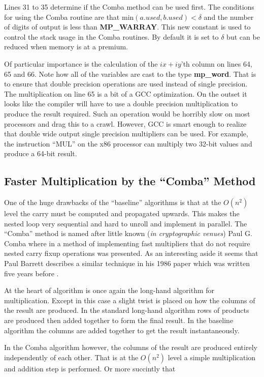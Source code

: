 \documentclass[b5paper]{book}
\begin{document}
Lines 31 to 35 determine if the Comba method can be used first.  The conditions for using the Comba routine are that min$(a.used, b.used) < \delta$ and
the number of digits of output is less than \textbf{MP\_WARRAY}.  This new constant is used to control the stack usage in the Comba routines.  By
default it is set to $\delta$ but can be reduced when memory is at a premium.

Of particular importance is the calculation of the $ix+iy$'th column on lines 64, 65 and 66.  Note how all of the
variables are cast to the type \textbf{mp\_word}.  That is to ensure that double precision operations are used instead of single precision.  The
multiplication on line 65 is a bit of a GCC optimization.  On the outset it looks like the compiler will have to use a double precision
multiplication to produce the result required.  Such an operation would be horribly slow on most processors and drag this to a crawl.  However,
GCC is smart enough to realize that double wide output single precision multipliers can be used.  For example, the instruction ``MUL'' on the
x86 processor can multiply two 32-bit values and produce a 64-bit result.  

\subsection{Faster Multiplication by the ``Comba'' Method}

One of the huge drawbacks of the ``baseline'' algorithms is that at the $O(n^2)$ level the carry must be computed and propagated upwards.  This
makes the nested loop very sequential and hard to unroll and implement in parallel.  The ``Comba'' method is named after little known 
(\textit{in cryptographic venues}) Paul G. Comba where in \cite{COMBA} a method of implementing fast multipliers that do not require nested 
carry fixup operations was presented.  As an interesting aside it seems that Paul Barrett  describes a similar technique in
his 1986 paper \cite{BARRETT} which was written five years before \cite{COMBA}.  

At the heart of algorithm is once again the long-hand algorithm for multiplication.  Except in this case a slight twist is placed on how
the columns of the result are produced.  In the standard long-hand algorithm rows of products are produced then added together to form the 
final result.  In the baseline algorithm the columns are added together to get the result instantaneously.  

In the Comba algorithm however, the columns of the result are produced entirely independently of each other.  That is at the $O(n^2)$ level a 
simple multiplication and addition step is performed.  Or more succintly that 
\end{document}
